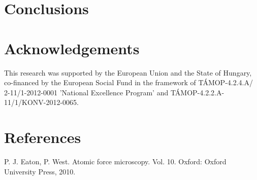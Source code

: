 \documentclass[3p]{elsarticle}
\begin{document}
\section{Conclusions}
\section*{Acknowledgements}
This research was supported by the European Union and the State of Hungary, co-financed by the European Social Fund in the framework of T\'{A}MOP-4.2.4.A/ 2-11/1-2012-0001 'National Excellence Program' and T\'{A}MOP-4.2.2.A-11/1/KONV-2012-0065.

\section*{References}

\begin{thebibliography}{5}

P. J. Eaton, P. West. Atomic force microscopy. Vol. 10. Oxford: Oxford University Press, 2010.

\end{thebibliography}
\end{document}
